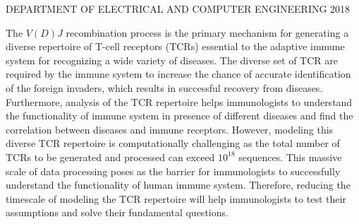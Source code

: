 \documentclass[thesis]{uathesis}
\begin{document}
\maketitlepage
{DEPARTMENT OF ELECTRICAL AND COMPUTER ENGINEERING}	%
{2018}							





\tableofcontents

\listoffigures

\listoftables


The $V(D)J$ recombination process is the primary mechanism for generating a diverse repertoire of T-cell receptors (TCRs) essential to the adaptive immune system for recognizing a wide variety of diseases. The diverse set of TCR are required by the immune system to increase the chance of accurate identification of the foreign invaders, which results in successful recovery from diseases. Furthermore, analysis of the TCR repertoire helps immunologists to understand the functionality of immune system in presence of different diseases and find the correlation between diseases and immune receptors. However, modeling this diverse TCR repertoire is computationally challenging as the total number of TCRs to be generated and processed can exceed $10^{18}$ sequences. This massive scale of data processing poses as the barrier for immunologists to successfully understand the functionality of human immune system. Therefore, reducing the timescale of modeling the TCR repertoire will help immunologists to test their assumptions and solve their fundamental questions. 
\end{document}

